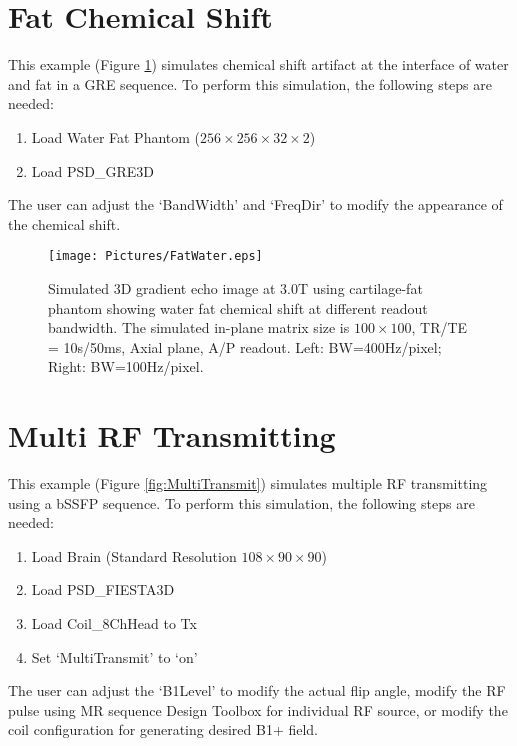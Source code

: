 \documentclass{book}%
\begin{document}
\section{Fat Chemical Shift}

This example (Figure \ref{fig:FatWater}) simulates chemical shift artifact at the interface of water and fat in a GRE sequence. To perform this simulation, the following steps are needed:

\begin{enumerate}
	\item Load Water Fat Phantom ($256 \times 256 \times 32 \times 2$)
  \item Load PSD\_GRE3D
\end{enumerate}

The user can adjust the `BandWidth' and `FreqDir' to modify the appearance of the chemical shift. 

\begin{figure}[htbp]
	\centering
		\texttt{[image: Pictures/FatWater.eps]}
	\caption{Simulated 3D gradient echo image at 3.0T using cartilage-fat phantom showing water fat chemical shift at different readout bandwidth. The simulated in-plane matrix size is $100 \times 100$, TR/TE = 10s/50ms, Axial plane, A/P readout. Left: BW=400Hz/pixel; Right: BW=100Hz/pixel.}
	\label{fig:FatWater}
\end{figure}

\section{Multi RF Transmitting}

This example (Figure \ref{fig:MultiTransmit}) simulates multiple RF transmitting using a bSSFP sequence. To perform this simulation, the following steps are needed:

\begin{enumerate}
	\item Load Brain (Standard Resolution $108 \times 90 \times 90$)
  \item Load PSD\_FIESTA3D
	\item Load Coil\_8ChHead to Tx
	\item Set `MultiTransmit' to `on'
\end{enumerate}

The user can adjust the `B1Level' to modify the actual flip angle, modify the RF pulse using MR sequence Design Toolbox for individual RF source, or modify the coil configuration for generating desired B1+ field.
\end{document}
